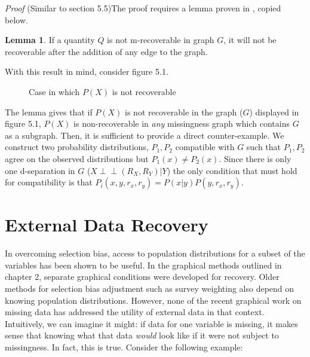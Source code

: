 \documentclass[12pt,twoside]{reedthesis}
\theoremstyle{definition}
\newtheorem{lemma}{Lemma}[section]
\newcommand{\dsep}{\perp \!\!\!\perp}
\begin{document}
\emph{Proof} (Similar to  \cite{Mohan_2013} section 5.5)The proof requires a lemma proven in \cite{Mohan_2013}, copied below.

\begin{lemma}
If a quantity $Q$ is not m-recoverable in graph $G$, it will not be recoverable after the addition of any edge to the graph.
\end{lemma}

With this result in mind, consider figure 5.1.

\begin{figure}
\centering
{}
\caption{Case in which $P(X)$ is not recoverable} \label{fig:NonRec}
\end{figure}

The lemma gives that if $P(X)$ is not recoverable in the graph ($G$) displayed in figure 5.1, $P(X)$ is non-recoverable in \emph{any} missingness graph which contains $G$ as a subgraph. Then, it is sufficient to provide a direct counter-example. We construct two probability distributions, $P_1, P_2$ compatible with $G$ such that $P_1, P_2$ agree on the observed distributions but $P_1(x) \neq P_2(x)$. Since there is only one d-separation in $G$ ($X \dsep (R_X, R_Y) | Y$) the only condition that must hold for compatibility is that $P_i(x, y, r_x, r_y) = P(x | y)P(y, r_x, r_y)$.  


\section{External Data Recovery}

In overcoming selection bias,  access to population distributions for a subset of the variables has been shown to be useful. In the graphical methods outlined in chapter 2, separate graphical conditions were developed for recovery. Older methods for selection bias adjustment such as survey weighting also depend on knowing population distributions. However, none of the recent graphical work on missing data has addressed the utility of external data in that context. Intuitively, we can imagine it might: if data for one variable is missing, it makes sense that knowing what that data \emph{would} look like if it were not subject to missingness. In fact, this is true. Consider the following example:
\end{document}
